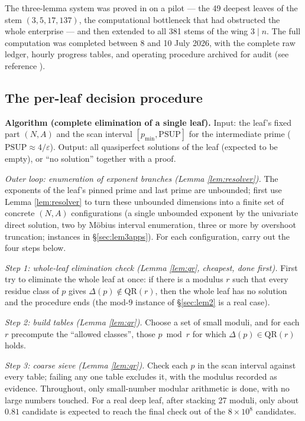 \documentclass[11pt]{article}
\theoremstyle{remark}
\newcommand{\QR}{\mathrm{QR}}
\newcommand{\PSUP}{\mathrm{PSUP}}
\begin{document}
The three-lemma system was proved in on a pilot --- the 49 deepest leaves of the stem $(3, 5, 17, 137)$, the computational bottleneck that had obstructed the whole enterprise --- and then extended to all 381 stems of the wing $3 \mid n$. The full computation was completed between 8 and 10 July 2026, with the complete raw ledger, hourly progress tables, and operating procedure archived for audit (see reference \cite{internal}).

\subsection{The per-leaf decision procedure}\label{sec:algorithm}

\textbf{Algorithm (complete elimination of a single leaf).} Input: the leaf's fixed part $(N, A)$ and the scan interval $[p_{\min}, \PSUP]$ for the intermediate prime ($\PSUP \approx 4/\varepsilon$). Output: all quasiperfect solutions of the leaf (expected to be empty), or ``no solution'' together with a proof.

\emph{Outer loop: enumeration of exponent branches (Lemma \ref{lem:resolver}).} The exponents of the leaf's pinned prime and last prime are unbounded; first use Lemma \ref{lem:resolver} to turn these unbounded dimensions into a finite set of concrete $(N, A)$ configurations (a single unbounded exponent by the univariate direct solution, two by M\"obius interval enumeration, three or more by overshoot truncation; instances in \S\ref{sec:lem3apps}). For each configuration, carry out the four steps below.

\emph{Step 1: whole-leaf elimination check (Lemma \ref{lem:qr}, cheapest, done first).} First try to eliminate the whole leaf at once: if there is a modulus $r$ such that every residue class of $p$ gives $\Delta(p) \notin \QR(r)$, then the whole leaf has no solution and the procedure ends (the mod-9 instance of \S\ref{sec:lem2} is a real case).

\emph{Step 2: build tables (Lemma \ref{lem:qr}).} Choose a set of small moduli, and for each $r$ precompute the ``allowed classes'', those $p \bmod r$ for which $\Delta(p) \in \QR(r)$ holds.

\emph{Step 3: coarse sieve (Lemma \ref{lem:qr}).} Check each $p$ in the scan interval against every table; failing any one table excludes it, with the modulus recorded as evidence. Throughout, only small-number modular arithmetic is done, with no large numbers touched. For a real deep leaf, after stacking 27 moduli, only about $0.81$ candidate is expected to reach the final check out of the $8 \times 10^8$ candidates.
\end{document}
